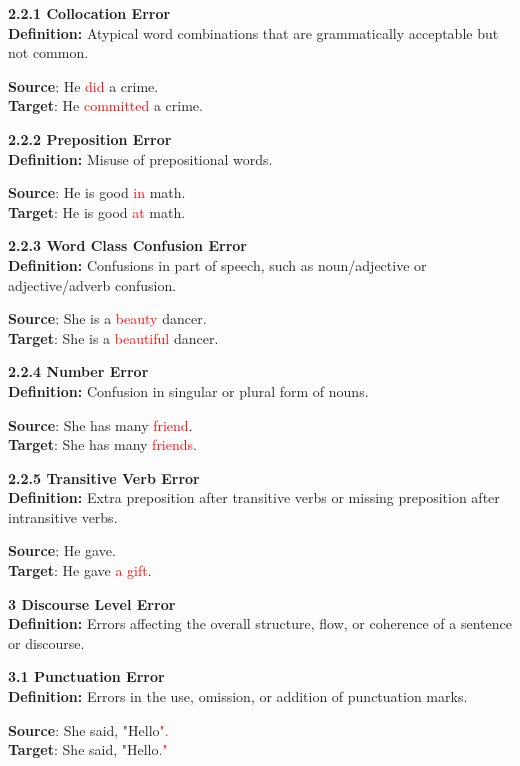 \begin{tcolorbox}[breakable]
\noindent \textbf{2.2.1 Collocation Error}\\
\textbf{Definition:} Atypical word combinations that are grammatically acceptable but not common.


\textbf{Source}: He \textcolor{red}{did} a crime. \\
\textbf{Target}: He \textcolor{red}{committed} a crime.


\noindent \textbf{2.2.2 Preposition Error}\\
\textbf{Definition:} Misuse of prepositional words.


\textbf{Source}: He is good \textcolor{red}{in} math. \\
\textbf{Target}: He is good \textcolor{red}{at} math.


\noindent \textbf{2.2.3 Word Class Confusion Error}\\
\textbf{Definition:} Confusions in part of speech, such as noun/adjective or adjective/adverb confusion.


\textbf{Source}: She is a \textcolor{red}{beauty} dancer. \\
\textbf{Target}: She is a \textcolor{red}{beautiful} dancer.


\noindent \textbf{2.2.4 Number Error}\\
\textbf{Definition:} Confusion in singular or plural form of nouns.


\textbf{Source}: She has many \textcolor{red}{friend}. \\
\textbf{Target}: She has many \textcolor{red}{friends}.


\noindent \textbf{2.2.5 Transitive Verb Error}\\
\textbf{Definition:} Extra preposition after transitive verbs or missing preposition after intransitive verbs.


\textbf{Source}: He gave. \\
\textbf{Target}: He gave \textcolor{red}{a gift}.


\noindent \textbf{3 Discourse Level Error}\\
\textbf{Definition:} Errors affecting the overall structure, flow, or coherence of a sentence or discourse.

\noindent \textbf{3.1 Punctuation Error}\\
\textbf{Definition:} Errors in the use, omission, or addition of punctuation marks.


\textbf{Source}: She said, "Hello\textcolor{red}{".} \\
\textbf{Target}: She said, "Hello\textcolor{red}{."}



\end{tcolorbox}
